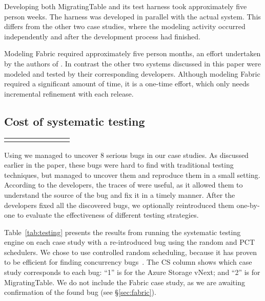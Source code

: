 Developing both MigratingTable and its \psharp test harness took approximately five person weeks. The harness was developed in parallel with the actual system. This differs from the other two case studies, where the modeling activity occurred independently and after the development process had finished.

Modeling Fabric required approximately five person months, an effort undertaken by the authors of \psharp. In contrast the other two systems discussed in this paper were modeled and tested by their corresponding developers. Although modeling Fabric required a significant amount of time, it is a one-time effort, which only needs incremental refinement with each release.

\subsection{Cost of systematic testing}
\label{sec:eval:machine_cost}

\setlength{\tabcolsep}{.72em}
\begin{table*}[t]
\small
\centering
\begin{tabular}{rl rrr rrr}
\centering

\end{tabular}
\caption{Results from running the \psharp random and PCT systematic testing schedulers for 100,000 executions. We report: time in seconds to find a bug (Time to Bug); number of scheduling steps when a bug was found (\#SS); and if a bug was found with a particular scheduler (BF?).}
\label{tab:testing}
\end{table*}

Using \psharp we managed to uncover 8 serious bugs in our case studies. As discussed earlier in the paper, these bugs were hard to find with traditional testing techniques, but \psharp managed to uncover them and reproduce them in a small setting. According to the developers, the traces of \psharp were useful, as it allowed them to understand the source of the bug and fix it in a timely manner. After the developers fixed all the discovered bugs, we optionally reintroduced them one-by-one to evaluate the effectiveness of different testing strategies.

Table~\ref{tab:testing} presents the results from running the \psharp systematic testing engine on each case study with a re-introduced bug using the random and PCT schedulers. We chose to use controlled random scheduling, because it has proven to be efficient for finding concurrency bugs~\cite{thomson2014sct, deligiannis2015psharp}. The CS column shows which case study corresponds to each bug: ``1'' is for the Azure Storage vNext; and ``2'' is for MigratingTable. We do not include the Fabric case study, as we are awaiting confirmation of the found bug (see \S\ref{sec:fabric}).



